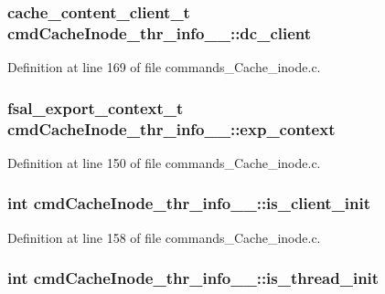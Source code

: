\subsubsection[{dc\_\-client}]{\setlength{\rightskip}{0pt plus 5cm}cache\_\-content\_\-client\_\-t {\bf cmdCacheInode\_\-thr\_\-info\_\-\_\-::dc\_\-client}}\label{structcmdCacheInode__thr__info_____d2310c9982c1c46a2ef848e2737cd577}




Definition at line 169 of file commands\_\-Cache\_\-inode.c.
\subsubsection[{exp\_\-context}]{\setlength{\rightskip}{0pt plus 5cm}fsal\_\-export\_\-context\_\-t {\bf cmdCacheInode\_\-thr\_\-info\_\-\_\-::exp\_\-context}}\label{structcmdCacheInode__thr__info_____0a20284e8253b99ee7e4b56461d9d9a2}




Definition at line 150 of file commands\_\-Cache\_\-inode.c.
\subsubsection[{is\_\-client\_\-init}]{\setlength{\rightskip}{0pt plus 5cm}int {\bf cmdCacheInode\_\-thr\_\-info\_\-\_\-::is\_\-client\_\-init}}\label{structcmdCacheInode__thr__info_____b6c442d475291f04ccab5264bb9d1832}




Definition at line 158 of file commands\_\-Cache\_\-inode.c.
\subsubsection[{is\_\-thread\_\-init}]{\setlength{\rightskip}{0pt plus 5cm}int {\bf cmdCacheInode\_\-thr\_\-info\_\-\_\-::is\_\-thread\_\-init}}\label{structcmdCacheInode__thr__info_____e3f101fe5aea33789f8944ab02b43b75}




